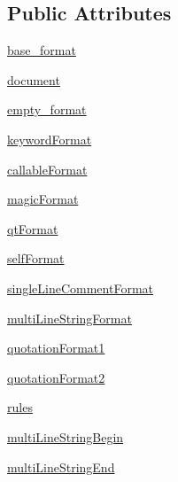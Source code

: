 \subsection*{Public Attributes}
\begin{DoxyCompactItemize}
\item 
\hyperlink{classhighlightedtextedit_1_1PythonHighlighter_ace01c833248e1d7efdb25a2e4d738c17}{base\+\_\+format}
\item 
\hyperlink{classhighlightedtextedit_1_1PythonHighlighter_a43ef97c0b426f674b3c3a4b4df881bbe}{document}
\item 
\hyperlink{classhighlightedtextedit_1_1PythonHighlighter_a3ae311978492be2338aec551c149bc80}{empty\+\_\+format}
\item 
\hyperlink{classhighlightedtextedit_1_1PythonHighlighter_a387ece357fa1a092e7cd47d0d7149658}{keyword\+Format}
\item 
\hyperlink{classhighlightedtextedit_1_1PythonHighlighter_a8ba918faa1519045580b4eba3e06c12b}{callable\+Format}
\item 
\hyperlink{classhighlightedtextedit_1_1PythonHighlighter_a06c8bf023714b03e791b84e1c20bc7d0}{magic\+Format}
\item 
\hyperlink{classhighlightedtextedit_1_1PythonHighlighter_ab064eb491aed976e6dbffae15a771d40}{qt\+Format}
\item 
\hyperlink{classhighlightedtextedit_1_1PythonHighlighter_abdb4fdf12868a2e2609fc09497882bc8}{self\+Format}
\item 
\hyperlink{classhighlightedtextedit_1_1PythonHighlighter_a225a459620b54c6674e8c34a326cb475}{single\+Line\+Comment\+Format}
\item 
\hyperlink{classhighlightedtextedit_1_1PythonHighlighter_af6b7af38a450abdfbb0e7771e4d5de02}{multi\+Line\+String\+Format}
\item 
\hyperlink{classhighlightedtextedit_1_1PythonHighlighter_a3d5db6728230e56c191ac844f1b93ef3}{quotation\+Format1}
\item 
\hyperlink{classhighlightedtextedit_1_1PythonHighlighter_a5f800cffe34b8b8e5220bef393d7f821}{quotation\+Format2}
\item 
\hyperlink{classhighlightedtextedit_1_1PythonHighlighter_ae5f14ed5382c6e3b1f984e8a24aeef19}{rules}
\item 
\hyperlink{classhighlightedtextedit_1_1PythonHighlighter_a5b0f5d42ad05324d60d6a16c1b3ee2b0}{multi\+Line\+String\+Begin}
\item 
\hyperlink{classhighlightedtextedit_1_1PythonHighlighter_a60347a63c56f4bc66a14d5baa7c02dad}{multi\+Line\+String\+End}
\end{DoxyCompactItemize}

